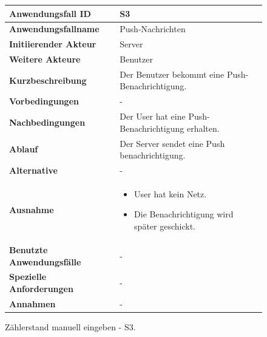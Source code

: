 \newpage

\begin{figure}[h]
	\centering
	\begin{tabularx}{\textwidth}{ X | X }
		\textbf{Anwendungsfall ID} & S3 \\ \hline
		\textbf{Anwendungsfallname} & Push-Nachrichten \\ \hline
		\textbf{Initiierender Akteur} & Server \\ \hline
		\textbf{Weitere Akteure} & Benutzer \\ \hline
		\textbf{Kurzbeschreibung} & Der Benutzer bekommt eine Push-Benachrichtigung. \\ \hline
		\textbf{Vorbedingungen} & - \\ \hline
		\textbf{Nachbedingungen} & Der User hat eine Push-Benachrichtigung erhalten. \\ \hline
		\textbf{Ablauf} & Der Server sendet eine Push benachrichtigung. \\ \hline
		\textbf{Alternative} & - \\ \hline
		\textbf{Ausnahme} &
		\begin{itemize}
			\item User hat kein Netz.
			\item Die Benachrichtigung wird später geschickt.
		\end{itemize} \\ \hline
		\textbf{Benutzte Anwendungsfälle} & - \\ \hline
		\textbf{Spezielle Anforderungen} & - \\ \hline
		\textbf{Annahmen} & -
	\end{tabularx}
	\caption{Zählerstand manuell eingeben - S3.}
	\label{fig:anwendungsfall-server-tabelle-xx-1}
\end{figure}